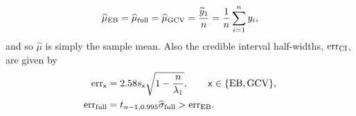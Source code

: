 \documentclass{svjour3}                     %
\newcommand{\hmu}{\widehat{\mu}}
\newcommand{\hsigma}{\widehat{\sigma}}
\newcommand{\MLE}{\textup{EB}}
\newcommand{\full}{\textup{full}}
\newcommand{\GCV}{\textup{GCV}}
\newcommand{\CI}{\textup{CI}}
\newcommand{\err}{\textup{err}}
\def\abs#1{\ensuremath{\left \lvert #1 \right \rvert}}
\begin{document}
\begin{theorem}
\begin{subequations}
\begin{align}
		\end{align}
	\end{subequations}

	\begin{equation}
	\label{muhatGCV-FB-MLE-Simple}
	\hmu_\MLE  = \hmu_{\full} = \hmu_{\GCV} =
	\frac{\widetilde{y}_1}{n} = \frac 1n \sum_{i=1}^n y_i,
	\end{equation}
	and so $\hmu$ is simply the sample mean.  
	Also the credible interval half-widths, $\err_{\CI}$, are given by
	\begin{subequations}
		\label{errSimple}
		\iffalse
		\begin{align}
		\label{eq:errMLEAllAsump}
		\err_\MLE  &
		=
		\frac{2.58}{n}\sqrt{
			\sum_{i=2}^{n} \frac{\abs{\widetilde{y}_i}^2}{\lambda_i}  
			\,
			\left( 1 -  \frac{n}{\lambda_1} \right) 
		}, \\
		\label{FJH:eq:errFullSimple}
		\err_{\textup{full}}
		&=
		t_{n-1,0.995}
		\sqrt{\frac{1}{n(n-1)} \sum_{i=2}^n \frac{\abs{\widetilde{y}_i}^2}{\lambda_i}  \left(\frac{\lambda_1}{n}  - 1  \right)}, \\
		\label{errGCVSimple}
		\err_{\textup{GCV}} & =
		\frac{2.58}{n}\left\{\sum_{i=2}^n \frac{\abs{\widetilde{y}_i}^2}{\lambda_i^2}  \left [ \frac 1n \sum_{i=1}^n \frac{1}{\lambda_i} \right]^{-1} 
		\left( 1 -  \frac{n}{\lambda_1} \right)  
		\right\}^{1/2}. 
		\end{align}
		\fi
		\begin{align}
		\label{eqn:err_MLEGCV}
		\err_{\mathsf{x}} & = 2.58 s_{\mathsf{x}} \sqrt{1 - \frac{n}{\lambda_1} }, \qquad \mathsf{x} \in \{\MLE, \GCV\},  \\ 
		\err_{\textup{full}} 
		& = t_{n-1,0.995} \hsigma_{\textup{full}} > \err_\MLE. \label{FJH:eq:errFull}
		\end{align}
	\end{subequations}
	

\end{theorem}
\end{document}
